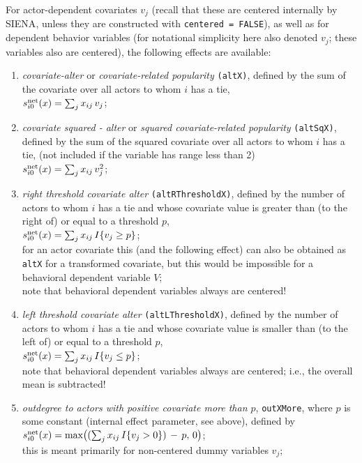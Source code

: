 \documentclass[a4paper,fleqn,11pt]{article}
\newcommand{\+}{\, + \,}
\newcommand{\si}{{\sf SIENA}}
\newcommand{\vit}{\theenumi}
\newcounter{savenumi}
\begin{document}
\noindent
For actor-dependent covariates $v_j$ (recall that these are
centered internally by \si, unless they are constructed with
\texttt{centered = FALSE}), as well as for dependent behavior
variables (for notational simplicity here also denoted $v_j$;
these variables also are centered),
the following effects are available:
\begin{enumerate}
\setcounter{enumi}{\value{savenumi}}

 \item {\em covariate-alter} or {\em covariate-related popularity}
 \texttt{(altX)},
 defined by the sum of the covariate over all actors to whom $i$ has a tie,\\
 $s^{\rm net}_{i\vit}(x) = \sum_j x_{ij}\, v_j$;

 \item {\em covariate squared - alter} or {\em squared covariate-related popularity} \texttt{(altSqX)},
 defined by the sum of the squared covariate over all actors to whom $i$ has a tie,
 (not included if the variable has range less than 2)\\
 $s^{\rm net}_{i\vit}(x) = \sum_j x_{ij}\, v_j^2$;

 \item {\em right threshold covariate alter}
 \texttt{(altRThresholdX)},
 defined by the number of actors to whom $i$ has a tie
 and whose covariate value
 is greater than (to the right of)  or equal to a threshold $p$,\\
 $s^{\rm net}_{i\vit}(x) = \sum_j x_{ij}\, I\{v_j \geq p\} $;\\
 for an actor covariate this (and the following effect)
 can also be obtained as \texttt{altX} for a transformed
 covariate, but this would be impossible for a behavioral dependent variable $V$;\\
 note that behavioral dependent variables always are centered!

 \item {\em left threshold covariate alter}
 \texttt{(altLThresholdX)},
 defined by the number of actors to whom $i$ has a tie
 and whose covariate value
 is smaller than (to the left of)  or equal to a threshold $p$,\\
 $s^{\rm net}_{i\vit}(x) = \sum_j x_{ij}\, I\{v_j \leq p\} $;\\
 note that behavioral dependent variables always are centered;
 i.e., the overall mean is subtracted!

 \item {\em outdegree to actors with positive covariate more than $p$},
  \texttt{outXMore},
  where $p$ is some constant (internal effect parameter, see above),
defined by \\
 $s^{\rm net}_{i\vit}(x) = \text{max}\big( (\sum_j x_{ij}\, I\{v_j > 0\}) \,-\, p,\, 0 \big)$;\\
 this is meant primarily for non-centered dummy variables $v_j$;


\end{enumerate}
\end{document}
